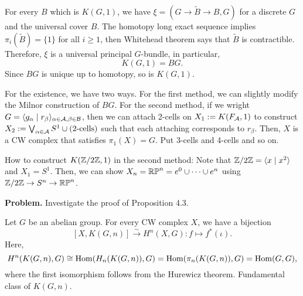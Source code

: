 \documentclass{../../../small}
\begin{document}
\begin{pf}
For every $B$ which is $K(G,1)$, we have $\xi=(G\to\tilde B\to B,G)$ for a discrete $G$ and the universal cover $B$.
The homotopy long exact sequence implies $\pi_i(\tilde B)=\{1\}$ for all $i\ge1$, then Whitehead theorem says that $\tilde B$ is contractible.
Therefore, $\xi$ is a universal principal $G$-bundle, in particular,
\[K(G,1)=BG.\]
Since $BG$ is unique up to homotopy, so is $K(G,1)$.

For the existence, we have two ways.
For the first method, we can slightly modify the Milnor construction of $BG$.
For the second method, if we wright $G=\langle g_\alpha\mid r_\beta\rangle_{\alpha\in\mathcal{A},\beta\in\mathcal{B}}$, then we can attach 2-cells on $X_1:=K(F_{\mathcal{A}},1)$ to construct $X_2:=\bigvee_{\alpha\in\mathcal{A}}S^1\cup(\text{2-cells})$ such that each attaching corresponds to $r_\beta$.
Then, $X$ is a CW complex that satisfies $\pi_1(X)=G$.
Put 3-cells and 4-cells and so on.
\end{pf}
\begin{ex*}
How to construct $K(\mathbb{Z}/2\mathbb{Z},1)$ in the second method:
Note that $\mathbb{Z}/2\mathbb{Z}=\langle x\mid x^2\rangle$ and $X_1=S^1$.
Then, we can show $X_n=\mathbb{RP}^n=e^0\cup\cdots\cup e^n$ using $\mathbb{Z}/2\mathbb{Z}\to S^n\to\mathbb{RP}^n$.
\end{ex*}

\noindent\textbf{Problem.}
Investigate the proof of Proposition 4.3.


\begin{thm*}[4.4]
Let $G$ be an abelian group.
For every CW complex $X$, we have a bijection
\[[X,K(G,n)]\xrightarrow{\sim} H^n(X,G):f\mapsto f^*(\iota).\]
Here,
\[H^n(K(G,n),G)\cong\operatorname{Hom}(H_n(K(G,n)),G)=\operatorname{Hom}(\pi_n(K(G,n)),G)=\operatorname{Hom}(G,G),\]
where the first isomorphism follows from the Hurewicz theorem.
Fundamental class of $K(G,n)$.
\end{thm*}
\end{document}
